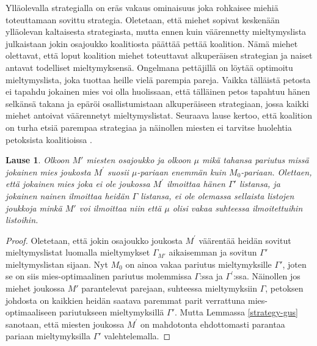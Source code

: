 \documentclass[finnish]{tktltiki2}
\newtheorem{lau}{Lause}
\theoremstyle{definition}
\theoremstyle{remark}
\begin{document}
Ylläolevalla strategialla on eräs vakaus ominaisuus joka rohkaisee miehiä toteuttamaan sovittu strategia. Oletetaan, että miehet sopivat keskenään ylläolevan kaltaisesta strategiasta, mutta ennen kuin väärennetty mieltymyslista julkaistaan jokin osajoukko koalitiosta päättää pettää koalition. Nämä miehet olettavat, että loput koalition miehet toteuttavat alkuperäisen strategian ja naiset antavat todelliset mieltymyksensä. Ongelmana pettäjillä on löytää optimoitu mieltymyslista, joka tuottaa heille vielä parempia pareja. Vaikka tälläistä petosta ei tapahdu jokainen mies voi olla huolissaan, että tälläinen petos tapahtuu hänen selkänsä takana ja epäröi osallistumistaan alkuperäiseen strategiaan, jossa kaikki miehet antoivat väärennetyt mieltymyslistat. Seuraava lause kertoo, että koalition on turha etsiä parempaa strategiaa ja näinollen miesten ei tarvitse huolehtia petoksista koalitioissa \cite{gusfield1989stable}.

\begin{lau}\cite[p, 58]{gusfield1989stable}
	Olkoon $M'$ miesten osajoukko ja olkoon $\mu$ mikä tahansa pariutus missä jokainen mies joukosta $M^{'}$ suosii $\mu$-pariaan enemmän kuin $M_0$-pariaan. Olettaen, että jokainen mies joka ei ole joukossa $M^{'}$ ilmoittaa hänen $\Gamma'$ listansa, ja jokainen nainen ilmoittaa heidän $\Gamma$ listansa, ei ole olemassa sellaista listojen joukkoja minkä $M'$ voi ilmoittaa niin että $\mu$ olisi vakaa suhteessa ilmoitettuihin listoihin.
\end{lau}

\begin{proof}
	Oletetaan, että jokin osajoukko joukosta $M^{'}$ väärentää heidän sovitut mieltymyslistat luomalla mieltymykset $\Gamma_{M'}$ aikaisemman ja sovitun $\Gamma'$ mieltymyslistan sijaan. Nyt $M_0$ on ainoa vakaa pariutus mieltymyksille $\Gamma'$, joten se on siis mies-optimaalinen pariutus molemmissa $\Gamma$:ssa ja $\Gamma^{'}$:ssa. Näinollen jos miehet joukossa $M'$ parantelevat parejaan, suhteessa mieltymyksiin $\Gamma$, petoksen johdosta on kaikkien heidän saatava paremmat parit verrattuna mies-optimaaliseen pariutukseen mieltymyksillä $\Gamma'$. Mutta Lemmassa \ref{strategy-gus} sanotaan, että miesten joukossa $M^{'}$ on mahdotonta ehdottomasti parantaa pariaan mieltymyksilla $\Gamma'$ valehtelemalla.
\end{proof}


%
%
% 
%



\end{document}

